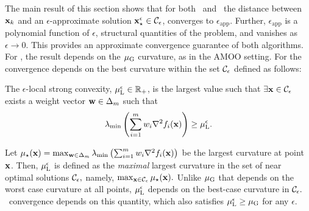 The main result of this section shows that for both \CAMOO\ and \PAMOO\ the distance between ${\mathbf{x}}_k$ and an $\epsilon$-approximate solution ${\mathbf{x}}_\star^\epsilon \in \mathcal{C}_\epsilon
$, converges to $\epsilon_{\mathrm{app}}$. Further, $\epsilon_{\mathrm{app}}$ is a polynomial function of $\epsilon$, structural quantities of the problem, and vanishes as $\epsilon\rightarrow 0$. This provides an approximate convergence guarantee of both algorithms. For \CAMOO, the result depends on the ${\mu_{\mathrm{G}}}$ curvature, as in the AMOO setting. For \PAMOO the convergence depends on the best curvature within the set $\mathcal{C}_{\epsilon}$ defined as follows:
\begin{definition} \label{def:mulocaleps}
     The $\epsilon$-local strong convexity, ${{\mu_{\mathrm{L}}^\epsilon}\in \mathbb{R}_{+}}$, is the largest value such that $\exists {\mathbf{x}}\in \mathcal{C}_\epsilon$ exists a weight vector ${\mathbf{w}}\in \Delta_m$ such that  
    \begin{align}
       \lambda_{\min}\left(\sum_{i=1}^m w_i \nabla^2 f_i({\mathbf{x}}) \right)\geq {\mu_{\mathrm{L}}^\epsilon}. \label{eq:mu_mulocaleps_definition}
    \end{align}
\end{definition}
Let $\mu_\star({\mathbf{x}})=\max_{{\mathbf{w}}\in \Delta_m} \lambda_{\min}\left(\sum_{i=1}^m w_i \nabla^2 f_i({\mathbf{x}}) \right)$ be the largest curvature at point ${\mathbf{x}}$. Then, ${\mu_{\mathrm{L}}^\epsilon}$ is defined as the \emph{maximal} largest curvature in the set of near optimal solutions $\mathcal{C}_\epsilon,$ namely, $\max_{{\mathbf{x}}\in \mathcal{C}_\epsilon} \mu_\star({\mathbf{x}}).$ Unlike ${\mu_{\mathrm{G}}}$ that depends on the worst case curvature at all points, ${\mu_{\mathrm{L}}^\epsilon}$  depends on the best-case curvature in $\mathcal{C}_\epsilon.$ \PAMOO\ convergence depends on this quantity, which also satisfies ${\mu_{\mathrm{L}}^\epsilon}\geq {\mu_{\mathrm{G}}}$ 
for any $\epsilon$.


